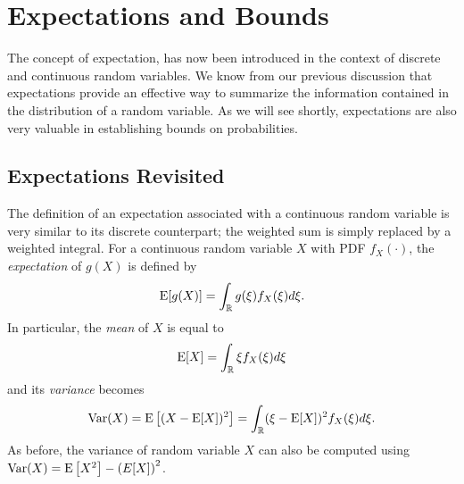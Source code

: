 \chapter{Expectations and Bounds}

The concept of expectation, has now been introduced in the context of discrete and continuous random variables.
We know from our previous discussion that expectations provide an effective way to summarize the information contained in the distribution of a random variable.
As we will see shortly, expectations are also very valuable in establishing bounds on probabilities.

\iffalse

\section{Expectations Revisited}

The definition of an expectation associated with a continuous random variable is very similar to its discrete counterpart;
the weighted sum is simply replaced by a weighted integral.
For a continuous random variable $X$ with PDF $f_X(\cdot)$, the \emph{expectation} of $g(X)$ is defined by 
\begin{equation*}
\mathrm{E} [g(X)]
= \int_{\mathbb{R}} g(\xi) f_X (\xi) d\xi .
\end{equation*}
In particular, the \emph{mean} of $X$ is equal to 
\begin{equation*}
\mathrm{E} [X]
= \int_{\mathbb{R}} \xi f_X (\xi) d\xi
\end{equation*}
and its \emph{variance} becomes 
\begin{equation*}
\mathrm{Var} (X) = \mathrm{E} \left[ (X - \mathrm{E}[X])^2 \right]
= \int_{\mathbb{R}} (\xi - \mathrm{E}[X])^2 f_X (\xi) d\xi .
\end{equation*}
As before, the variance of random variable $X$ can also be computed using $\mathrm{Var}(X) = \mathrm{E} \left[ X^2 \right] - \left( E[X] \right)^2$.

